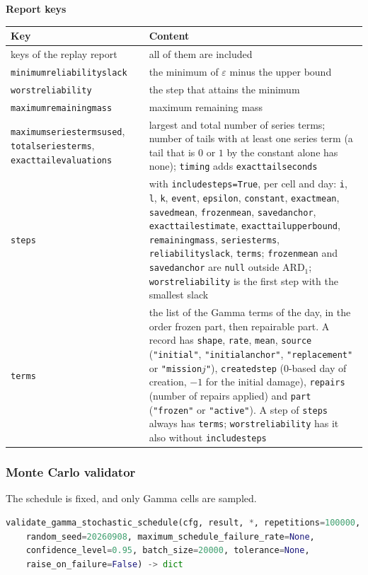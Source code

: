 \documentclass[11pt,a4paper]{article}
\makeatletter
\theoremstyle{plain}
\theoremstyle{definition}
\newcommand{\ARDone}{\mathrm{ARD}_{1}}
\newcommand{\blockhead}[1]{\par\noindent\textbf{#1}\par\nobreak}
\renewcommand{\_}{\textunderscore\allowbreak{}}
\providecommand{\rejrow}[2]{{\raggedright #1\par} & {\raggedright #2\par} \\}
\providecommand{\tabstart}[2]{\begingroup\small\begin{longtable}{@{}#1@{}}\toprule #2 \\ \midrule \endhead}
\providecommand{\tabend}{\bottomrule\end{longtable}\endgroup}
\makeatother
\begin{document}
\blockhead{Report keys}
\tabstart{p{5.2cm}p{9.8cm}}{Key & Content}
\rejrow{keys of the replay report}{all of them are included}
\rejrow{\texttt{minimum\_reliability\_slack}}{the minimum of $\varepsilon$ minus the upper bound}
\rejrow{\texttt{worst\_reliability}}{the step that attains the minimum}
\rejrow{\texttt{maximum\_remaining\_mass}}{maximum remaining mass}
\rejrow{\texttt{maximum\_series\_terms\_used}, \texttt{total\_series\_terms}, \texttt{exact\_tail\_evaluations}}{largest and total number of series terms; number of tails with at least one series term (a tail that is $0$ or $1$ by the constant alone has none); \texttt{timing} adds \texttt{exact\_tail\_seconds}}
\rejrow{\texttt{steps}}{with \texttt{include\_steps=True}, per cell and day: \texttt{i}, \texttt{l}, \texttt{k}, \texttt{event}, \texttt{epsilon}, \texttt{constant}, \texttt{exact\_mean}, \texttt{saved\_mean}, \texttt{frozen\_mean}, \texttt{saved\_anchor}, \texttt{exact\_tail\_estimate}, \texttt{exact\_tail\_upper\_bound}, \texttt{remaining\_mass}, \texttt{series\_terms}, \texttt{reliability\_slack}, \texttt{terms}; \texttt{frozen\_mean} and \texttt{saved\_anchor} are \texttt{null} outside $\ARDone$; \texttt{worst\_reliability} is the first step with the smallest slack}
\rejrow{\texttt{terms}}{the list of the Gamma terms of the day, in the order frozen part, then repairable part. A record has \texttt{shape}, \texttt{rate}, \texttt{mean}, \texttt{source} (\texttt{"initial"}, \texttt{"initial\_anchor"}, \texttt{"replacement"} or \texttt{"mission\_}$j$\texttt{"}), \texttt{created\_step} (0-based day of creation, $-1$ for the initial damage), \texttt{repairs} (number of repairs applied) and \texttt{part} (\texttt{"frozen"} or \texttt{"active"}). A step of \texttt{steps} always has \texttt{terms}; \texttt{worst\_reliability} has it also without \texttt{include\_steps}}
\tabend

\subsubsection{Monte Carlo validator}

The schedule is fixed, and only Gamma cells are sampled.

\begin{lstlisting}[language=Python]
validate_gamma_stochastic_schedule(cfg, result, *, repetitions=100000,
    random_seed=20260908, maximum_schedule_failure_rate=None,
    confidence_level=0.95, batch_size=20000, tolerance=None,
    raise_on_failure=False) -> dict
\end{lstlisting}
\end{document}
